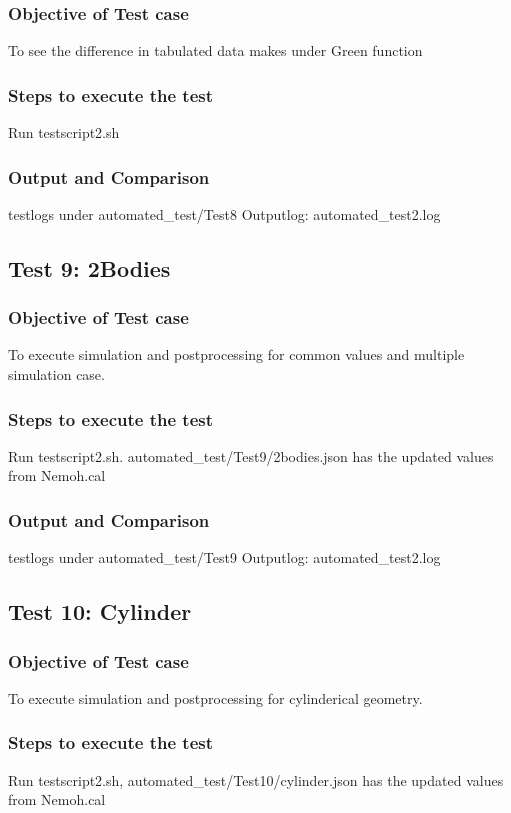 \documentclass[12pt]{article}
\begin{document}
\subsubsection{Objective of Test case}
To see the difference in tabulated data makes under Green function
\subsubsection{Steps to execute the test}
Run testscript2.sh
\subsubsection{Output and Comparison}
testlogs under automated_test/Test8
Outputlog: automated_test2.log

\subsection{Test 9: 2Bodies}
\subsubsection{Objective of Test case}
To execute simulation and postprocessing for common values and multiple simulation case.
\subsubsection{Steps to execute the test}
Run testscript2.sh. automated_test/Test9/2bodies.json has the updated values from Nemoh.cal
\subsubsection{Output and Comparison}
testlogs under automated_test/Test9
Outputlog: automated_test2.log

\subsection{Test 10: Cylinder}
\subsubsection{Objective of Test case}
To execute simulation and postprocessing for cylinderical geometry.
\subsubsection{Steps to execute the test}
Run testscript2.sh, automated_test/Test10/cylinder.json has the updated values from Nemoh.cal
\end{document}
